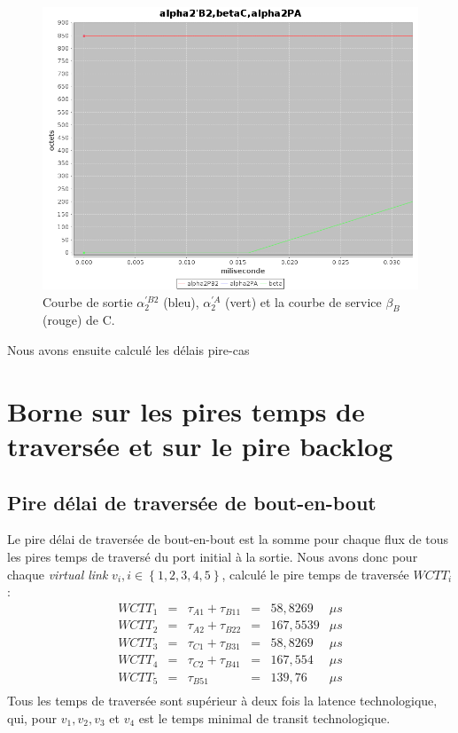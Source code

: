\begin{figure}[!ht]%
\centering%
\noindent\includegraphics[width = .4\textwidth]{./II/images/alpha2PB2.png}%
\caption{\label{fig:alpha2PB2}Courbe de sortie $\alpha_2^{'B2}$ (bleu), $\alpha_2^{'A}$ (vert) et la courbe de service $\beta_B$ (rouge) de C.}%
\end{figure}
\newpage 
Nous avons ensuite calculé les délais pire-cas 





\section{Borne sur les pires temps de traversée et sur le pire backlog}

\subsection{Pire délai de traversée de bout-en-bout}
Le pire délai de traversée de bout-en-bout est la somme pour chaque flux de tous les pires temps de traversé du port initial à la sortie.
Nous avons donc pour chaque \emph{virtual link} $v_i, i \in \left\lbrace 1,2,3,4,5\right\rbrace$, calculé le pire temps de traversée $WCTT_i$ :
\begin{equation}
\begin{array}{lclcll}
WCTT_1	&=&	\tau_{A1} + \tau_{B11} 	&=& 58,8269&\mu s\\
WCTT_2	&=&	\tau_{A2} + \tau_{B22} 	&=& 167,5539&\mu s\\
WCTT_3	&=&	\tau_{C1} + \tau_{B31} 	&=& 58,8269	&\mu s\\
WCTT_4	&=&	\tau_{C2} + \tau_{B41} 	&=& 167,554	&\mu s\\
WCTT_5	&=&	\tau_{B51} 				&=& 139,76	&\mu s\\
\end{array}
\end{equation}
Tous les temps de traversée sont supérieur à deux fois la latence technologique, qui, pour $v_1, v_2, v_3$ et $v_4$ est le temps minimal de transit technologique.\\

